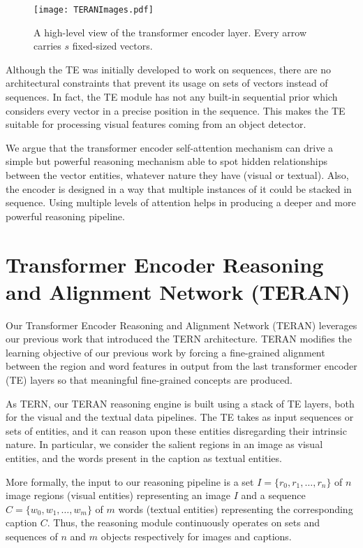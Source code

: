 \documentclass[acmsmall]{acmart}
\newcommand{\majorrevised}[1]{#1}
\begin{document}
\begin{figure*}[t]
    \centering
    \texttt{[image: TERANImages.pdf]}
  \caption{\majorrevised{A high-level view of the transformer encoder layer. Every arrow carries $s$ fixed-sized vectors.}}
  \label{fig:transformer_encoder} 
\end{figure*}

Although the TE was initially developed to work on sequences, there are no architectural constraints that prevent its usage on sets of vectors instead of sequences. In fact, the TE module has not any built-in sequential prior which considers every vector in a precise position in the sequence. This makes the TE suitable for processing visual features coming from an object detector.

We argue that the transformer encoder self-attention mechanism can drive a simple but powerful reasoning mechanism able to spot hidden relationships between the vector entities, whatever nature they have (visual or textual). Also, the encoder is designed in a way that multiple instances of it could be stacked in sequence. Using multiple levels of attention helps in producing a deeper and more powerful reasoning pipeline.





\section{Transformer Encoder Reasoning and Alignment Network (TERAN)}
Our Transformer Encoder Reasoning and Alignment Network (TERAN) leverages our previous work \cite{messina2020tern} that introduced the TERN architecture. TERAN modifies the learning objective of our previous work by forcing a fine-grained alignment between the region and word features in output from the last transformer encoder (TE) layers so that meaningful fine-grained concepts are produced. 

As TERN, our TERAN reasoning engine is built using a stack of TE layers, both for the visual and the textual data pipelines. The TE takes as input sequences or sets of entities, and it can reason upon these entities disregarding their intrinsic nature.
In particular, we consider the salient regions in an image as visual entities, and the words present in the caption as textual entities.

More formally, the input to our reasoning pipeline is a set $I = \{r_0, r_1, \ldots, r_n\}$ of $n$ image regions (visual entities) representing an image $I$ and a sequence $C = \{w_0, w_1, \ldots, w_m\}$ of $m$ words (textual entities) representing the corresponding caption $C$.
Thus, the reasoning module continuously operates on sets and sequences of $n$ and $m$ objects respectively for images and captions. 
\end{document}
